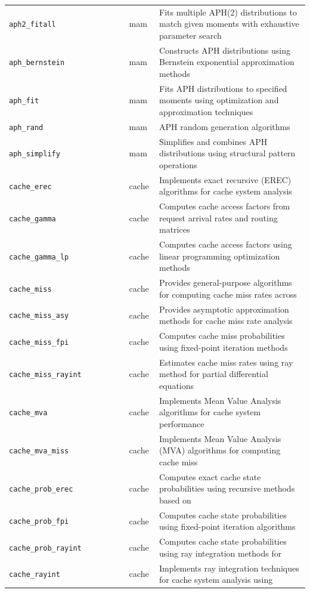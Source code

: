 \begin{footnotesize}
\begin{longtable}{|p{0.4\linewidth}|p{0.1\linewidth}|p{0.5\linewidth}|}
\texttt{aph2\_fitall} & mam & Fits multiple APH(2) distributions to match given moments with exhaustive parameter search\\
\texttt{aph\_bernstein} & mam & Constructs APH distributions using Bernstein exponential approximation methods\\
\texttt{aph\_fit} & mam & Fits APH distributions to specified moments using optimization and approximation techniques\\
\texttt{aph\_rand} & mam & APH random generation algorithms\\
\texttt{aph\_simplify} & mam & Simplifies and combines APH distributions using structural pattern operations\\
\texttt{cache\_erec} & cache & Implements exact recursive (EREC) algorithms for cache system analysis\\
\texttt{cache\_gamma} & cache & Computes cache access factors from request arrival rates and routing matrices\\
\texttt{cache\_gamma\_lp} & cache & Computes cache access factors using linear programming optimization methods\\
\texttt{cache\_miss} & cache & Provides general-purpose algorithms for computing cache miss rates across\\
\texttt{cache\_miss\_asy} & cache & Provides asymptotic approximation methods for cache miss rate analysis\\
\texttt{cache\_miss\_fpi} & cache & Computes cache miss probabilities using fixed-point iteration methods\\
\texttt{cache\_miss\_rayint} & cache & Estimates cache miss rates using ray method for partial differential equations\\
\texttt{cache\_mva} & cache & Implements Mean Value Analysis algorithms for cache system performance\\
\texttt{cache\_mva\_miss} & cache & Implements Mean Value Analysis (MVA) algorithms for computing cache miss\\
\texttt{cache\_prob\_erec} & cache & Computes exact cache state probabilities using recursive methods based on\\
\texttt{cache\_prob\_fpi} & cache & Computes cache state probabilities using fixed-point iteration algorithms\\
\texttt{cache\_prob\_rayint} & cache & Computes cache state probabilities using ray integration methods for\\
\texttt{cache\_rayint} & cache & Implements ray integration techniques for cache system analysis using\\

\end{longtable}
\end{footnotesize}
